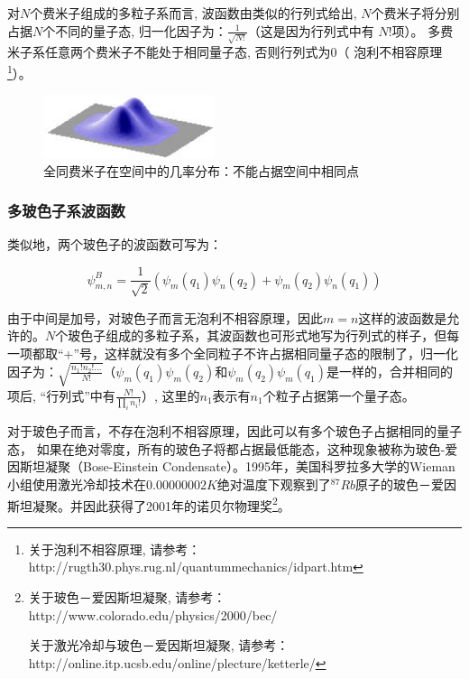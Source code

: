 对$N$个费米子组成的多粒子系而言, 波函数由类似的行列式给出,
$N$个费米子将分别占据$N$个不同的量子态,
归一化因子为：$\frac{1}{\sqrt{N!}}$（这是因为行列式中有 $N!$项）。
多费米子系任意两个费米子不能处于相同量子态, 否则行列式为$0$（
泡利不相容原理\footnote{关于泡利不相容原理,
请参考：http://rugth30.phys.rug.nl/quantummechanics/idpart.htm}）。



\begin{figure}[h]
\begin{center}
\includegraphics[clip,width=5cm]{IdenticalParticles/31-1.ps}
\caption{全同费米子在空间中的几率分布：不能占据空间中相同点}
\end{center}
\end{figure}


\subsubsection{多玻色子系波函数}

类似地，两个玻色子的波函数可写为：


\begin{equation}\label{two-bosons}
  \psi_{m,n}^B = \frac{1}{\sqrt 2} ( \psi_m(q_1)\psi_n(q_2) +
\psi_m(q_2)\psi_n(q_1))
\end{equation}



由于中间是加号，对玻色子而言无泡利不相容原理，因此$m=n$这样的波函数是允许的。$N$个玻色子组成的多粒子系，其波函数也可形式地写为行列式的样子，但每一项都取“+”号，这样就没有多个全同粒子不许占据相同量子态的限制了，归一化因子为：$\sqrt{\frac{n_1!
n_2 !
...}{N!}}$（$\psi_m(q_1)\psi_m(q_2)$和$\psi_m(q_2)\psi_m(q_1)$是一样的，合并相同的项后,
``行列式''中有$\frac{{N!}}{{\mathop \prod \limits_i n_i !}}$）,
这里的$n_1$表示有$n_1$个粒子占据第一个量子态。


对于玻色子而言，不存在泡利不相容原理，因此可以有多个玻色子占据相同的量子态，
如果在绝对零度，所有的玻色子将都占据最低能态，这种现象被称为玻色-爱因斯坦凝聚（Bose-Einstein
Condensate）。1995年，美国科罗拉多大学的Wieman小组使用激光冷却技术在$0.000
000 02
K$绝对温度下观察到了${}^{87}Rb$原子的玻色－爱因斯坦凝聚。并因此获得了2001年的诺贝尔物理奖\footnote{关于玻色－爱因斯坦凝聚,
请参考：http://www.colorado.edu/physics/2000/bec/

关于激光冷却与玻色－爱因斯坦凝聚,
请参考：http://online.itp.ucsb.edu/online/plecture/ketterle/}。

